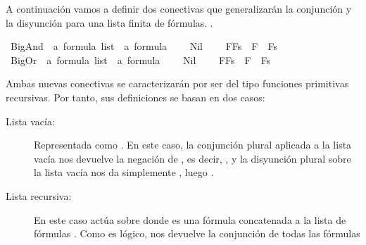 \begin{isabellebody}
\begin{isamarkuptext}
A continuación vamos a definir dos conectivas que generalizarán la conjunción y la disyunción
para una lista finita de fórmulas. .%
\end{isamarkuptext}\isamarkuptrue%
\isamarkupfalse%
\ BigAnd\ {\isacharcolon}{\isacharcolon}\ {\isachardoublequoteopen}{\isacharprime}a\ formula\ list\ {\isasymRightarrow}\ {\isacharprime}a\ formula{\isachardoublequoteclose}\ {\isacharparenleft}{\isachardoublequoteopen}\isactrlbold {\isasymAnd}{\isacharunderscore}{\isachardoublequoteclose}{\isacharparenright}\ \isanewline
\ \ {\isachardoublequoteopen}\isactrlbold {\isasymAnd}Nil\ {\isacharequal}\ {\isacharparenleft}\isactrlbold {\isasymnot}{\isasymbottom}{\isacharparenright}{\isachardoublequoteclose}\ \isanewline
{\isacharbar}\ {\isachardoublequoteopen}\isactrlbold {\isasymAnd}{\isacharparenleft}F{\isacharhash}Fs{\isacharparenright}\ {\isacharequal}\ F\ \isactrlbold {\isasymand}\ \isactrlbold {\isasymAnd}Fs{\isachardoublequoteclose}\isanewline
\isanewline
{}\isamarkupfalse%
\ BigOr\ {\isacharcolon}{\isacharcolon}\ {\isachardoublequoteopen}{\isacharprime}a\ formula\ list\ {\isasymRightarrow}\ {\isacharprime}a\ formula{\isachardoublequoteclose}\ {\isacharparenleft}{\isachardoublequoteopen}\isactrlbold {\isasymOr}{\isacharunderscore}{\isachardoublequoteclose}{\isacharparenright}\ \isanewline
\ \ {\isachardoublequoteopen}\isactrlbold {\isasymOr}Nil\ {\isacharequal}\ {\isasymbottom}{\isachardoublequoteclose}\ \isanewline
{\isacharbar}\ {\isachardoublequoteopen}\isactrlbold {\isasymOr}{\isacharparenleft}F{\isacharhash}Fs{\isacharparenright}\ {\isacharequal}\ F\ \isactrlbold {\isasymor}\ \isactrlbold {\isasymOr}Fs{\isachardoublequoteclose}%
\begin{isamarkuptext}%
Ambas nuevas conectivas se caracterizarán por ser del tipo funciones primitivas recursivas. Por
tanto, sus definiciones se basan en dos casos:
  \begin{description}
  \item[Lista vacía:] Representada como . En este caso, la conjunción plural aplicada a la lista
vacía nos devuelve la negación de , es decir, , y la disyunción plural sobre la lista
vacía nos da simplemente , luego . 
  \item[Lista recursiva:] En este caso actúa sobre  donde  es una fórmula concatenada a la
lista de fórmulas . Como es lógico,  nos devuelve la conjunción de todas las fórmulas

\end{description}
\end{isamarkuptext}
\end{isabellebody}
